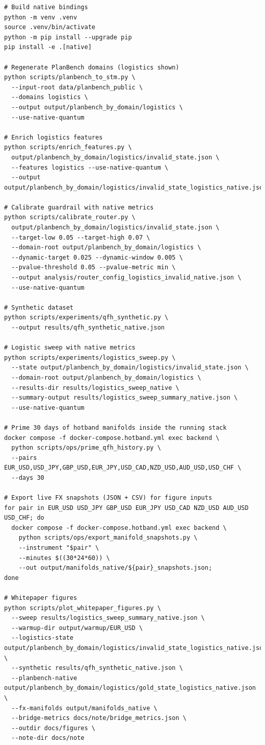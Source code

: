 \documentclass[11pt]{article}
\begin{document}
\begin{verbatim}
# Build native bindings
python -m venv .venv
source .venv/bin/activate
python -m pip install --upgrade pip
pip install -e .[native]

# Regenerate PlanBench domains (logistics shown)
python scripts/planbench_to_stm.py \
  --input-root data/planbench_public \
  --domains logistics \
  --output output/planbench_by_domain/logistics \
  --use-native-quantum

# Enrich logistics features
python scripts/enrich_features.py \
  output/planbench_by_domain/logistics/invalid_state.json \
  --features logistics --use-native-quantum \
  --output output/planbench_by_domain/logistics/invalid_state_logistics_native.json

# Calibrate guardrail with native metrics
python scripts/calibrate_router.py \
  output/planbench_by_domain/logistics/invalid_state.json \
  --target-low 0.05 --target-high 0.07 \
  --domain-root output/planbench_by_domain/logistics \
  --dynamic-target 0.025 --dynamic-window 0.005 \
  --pvalue-threshold 0.05 --pvalue-metric min \
  --output analysis/router_config_logistics_invalid_native.json \
  --use-native-quantum

# Synthetic dataset
python scripts/experiments/qfh_synthetic.py \
  --output results/qfh_synthetic_native.json

# Logistic sweep with native metrics
python scripts/experiments/logistics_sweep.py \
  --state output/planbench_by_domain/logistics/invalid_state.json \
  --domain-root output/planbench_by_domain/logistics \
  --results-dir results/logistics_sweep_native \
  --summary-output results/logistics_sweep_summary_native.json \
  --use-native-quantum

# Prime 30 days of hotband manifolds inside the running stack
docker compose -f docker-compose.hotband.yml exec backend \
  python scripts/ops/prime_qfh_history.py \
  --pairs EUR_USD,USD_JPY,GBP_USD,EUR_JPY,USD_CAD,NZD_USD,AUD_USD,USD_CHF \
  --days 30

# Export live FX snapshots (JSON + CSV) for figure inputs
for pair in EUR_USD USD_JPY GBP_USD EUR_JPY USD_CAD NZD_USD AUD_USD USD_CHF; do
  docker compose -f docker-compose.hotband.yml exec backend \
    python scripts/ops/export_manifold_snapshots.py \
    --instrument "$pair" \
    --minutes $((30*24*60)) \
    --out output/manifolds_native/${pair}_snapshots.json;
done

# Whitepaper figures
python scripts/plot_whitepaper_figures.py \
  --sweep results/logistics_sweep_summary_native.json \
  --warmup-dir output/warmup/EUR_USD \
  --logistics-state output/planbench_by_domain/logistics/invalid_state_logistics_native.json \
  --synthetic results/qfh_synthetic_native.json \
  --planbench-native output/planbench_by_domain/logistics/gold_state_logistics_native.json \
  --fx-manifolds output/manifolds_native \
  --bridge-metrics docs/note/bridge_metrics.json \
  --outdir docs/figures \
  --note-dir docs/note
\end{verbatim}
\end{document}
